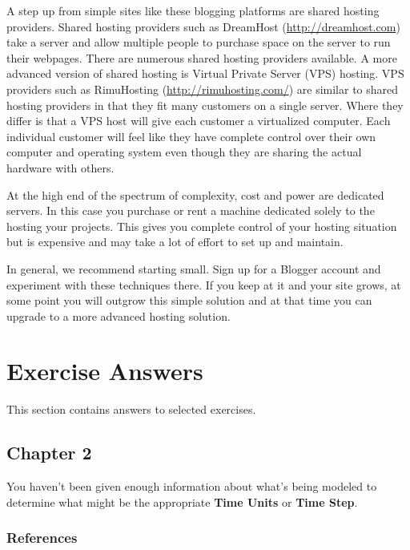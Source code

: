 \documentclass[]{memoir}
\renewcommand{\u}[1]{\textbf{#1}}
\begin{document}
A step up from simple sites like these blogging platforms are shared
hosting providers. Shared hosting providers such as DreamHost
(\url{http://dreamhost.com}) take a server and allow multiple people to
purchase space on the server to run their webpages. There are numerous
shared hosting providers available. A more advanced version of shared
hosting is Virtual Private Server (VPS) hosting. VPS providers such as
RimuHosting (\url{http://rimuhosting.com/}) are similar to shared
hosting providers in that they fit many customers on a single server.
Where they differ is that a VPS host will give each customer a
virtualized computer. Each individual customer will feel like they have
complete control over their own computer and operating system even
though they are sharing the actual hardware with others.

At the high end of the spectrum of complexity, cost and power are
dedicated servers. In this case you purchase or rent a machine dedicated
solely to the hosting your projects. This gives you complete control of
your hosting situation but is expensive and may take a lot of effort to
set up and maintain.

In general, we recommend starting small. Sign up for a Blogger account
and experiment with these techniques there. If you keep at it and your
site grows, at some point you will outgrow this simple solution and at
that time you can upgrade to a more advanced hosting solution.

\chapter{Exercise Answers}

This section contains answers to selected exercises.

\section{Chapter 2}


You haven't been given enough information about what's being modeled to
determine what might be the appropriate \u{Time Units} or \u{Time Step}.

\subsection{References}
\end{document}
